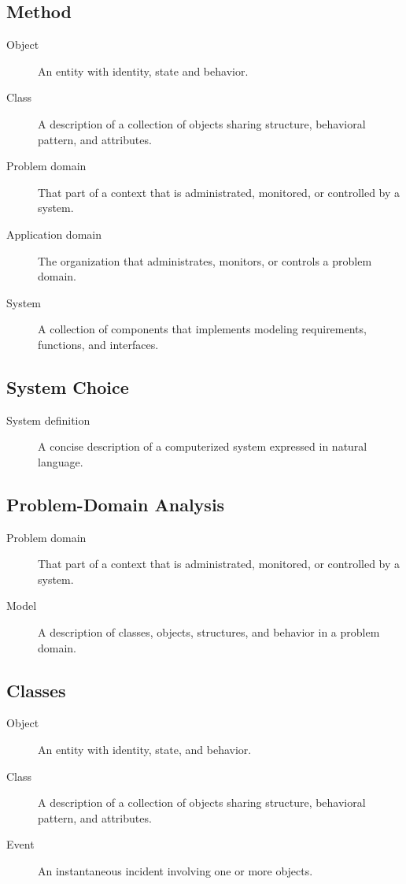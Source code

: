 \subsection{Method}
\begin{description}
    \item[Object] An entity with identity, state and behavior.
    \item[Class] A description of a collection of objects sharing structure, behavioral pattern, and attributes.
    \item[Problem domain] That part of a context that is administrated, monitored, or controlled by a system.
    \item[Application domain] The organization that administrates, monitors, or controls a problem domain.
    \item[System] A collection of components that implements modeling requirements, functions, and interfaces.
\end{description}

\subsection{System Choice}
\begin{description}
    \item[System definition] A concise description of a computerized system expressed in natural language.
\end{description}

\subsection{Problem-Domain Analysis}
\begin{description}
    \item[Problem domain] That part of a context that is administrated, monitored, or controlled by a system.
    \item[Model] A description of classes, objects, structures, and behavior in a problem domain.
\end{description}

\subsection{Classes}
\begin{description}
    \item[Object] An entity with identity, state, and behavior.
    \item[Class] A description of a collection of objects sharing structure, behavioral pattern, and attributes.
    \item[Event] An instantaneous incident involving one or more objects.
\end{description}

